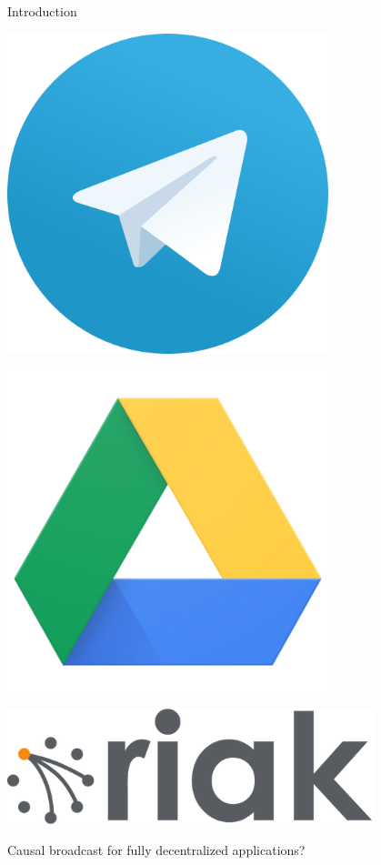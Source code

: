 \documentclass[10pt, xcolor={usenames, dvipsnames}]{beamer}
\begin{document}
\begin{frame}{Introduction}
\begin{minipage}{0.19\textwidth}
    \end{minipage}
    \begin{minipage}{0.19\textwidth}
      \centering
      \includegraphics[width=0.7\textwidth]{logos/telegram.png}
    \end{minipage}    
    \begin{minipage}{0.19\textwidth}
      \centering
      \includegraphics[width=0.7\textwidth]{logos/google.png}
    \end{minipage}
    \begin{minipage}{0.19\textwidth}
      \centering
      \includegraphics[width=0.8\textwidth]{logos/riak.png}
    \end{minipage}

    \vspace{2em}

    Causal broadcast for fully decentralized applications?

\end{frame}
\end{document}
